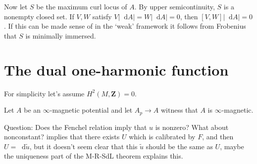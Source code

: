\documentclass[reqno,11pt]{amsart}
\newcommand{\ZZ}{\mathbf{Z}}
\newcommand*\dif{\mathop{}\!\mathrm{d}}
\theoremstyle{definition}
\numberwithin{equation}{section}
\begin{document}
Now let $S$ be the maximum curl locus of $A$.
By upper semicontinuity, $S$ is a nonempty closed set.
If $V, W$ satisfy $V|\dif A| = W|\dif A| = 0$, then $[V, W]|\dif A| = 0$.
If this can be made sense of in the `weak' framework it follows from Frobenius that $S$ is minimally immersed.



\section{The dual one-harmonic function}
For simplicity let's assume $H^2(M, \ZZ) = 0$.

Let $A$ be an $\infty$-magnetic potential and let $A_p \to A$ witness that $A$ is $\infty$-magnetic.


Question: Does the Fenchel relation imply that $u$ is nonzero?
What about nonconstant?
\cite{bangert_cui_2017} implies that there exists $U$ which is calibrated by $F$, and then $U = \dif \tilde u$, but it doesn't seem clear that this $\tilde u$ should be the same as $U$, maybe the uniqueness part of the M-R-SdL theorem explains this.
\end{document}
